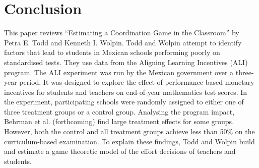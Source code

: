 \newpage

\section{Conclusion}
\label{sec:conclusion}


This paper reviews “Estimating a Coordination Game in the Classroom” by Petra E. Todd and Kenneth I. Wolpin. Todd and Wolpin attempt to identify factors that lead to students in Mexican schools performing poorly on standardised tests. They use data from the Aligning Learning Incentives (ALI) program. The ALI experiment was run by the Mexican government over a three- year period. It was designed to explore the effect of performance-based monetary incentives for students and teachers on end-of-year mathematics test scores. In the experiment, participating schools were randomly assigned to either one of three treatment groups or a control group.
Analysing the program impact, Behrman et al. (forthcoming) find large treatment effects for some groups. However, both the control and all treatment groups achieve less than 50\% on the curriculum-based examination. To explain these findings, Todd and Wolpin build and estimate a game theoretic model of the effort decisions of teachers and students. 
